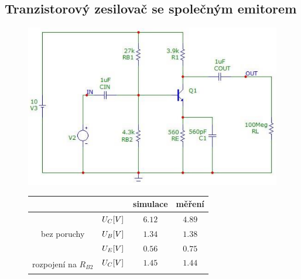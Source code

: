\documentclass{article}
\begin{document}
% 

\subsection*{Tranzistorový zesilovač se společným emitorem}

\begin{figure}[H]
  \begin{minipage}[t]{0.55\textwidth}
    \vspace{10mm}
    \includegraphics[width=\textwidth]{sim/ukol1/sch.png}
    \caption{Schema zapojení bez poruchy}
    \label{fig:sch-se}
  \end{minipage}
  \hfil
  \begin{minipage}[t]{0.4\textwidth}
    \begin{table}[H]
      \centering
      \vspace{-10mm}
      \begin{tabular}{|c|c|c|c|}
      \hline
                                                &               & simulace                  & měření                    \\ \hline  
      \multirow{3}{*}{bez poruchy}              &	\(U_C\-[V]\)  & \(6.12\)                  & \(4.89\)                  \\ \cline{2-4}
                                                & \(U_B\-[V]\)  & \(1.34\)                  & \(1.38\)                  \\ \cline{2-4}
                                                & \(U_E\-[V]\)  & \(0.56\)                  & \(0.75\)                  \\ \hline
      \multirow{3}{*}{rozpojení na \(R_{B2}\)}  &	\(U_C\-[V]\)  & \(1.45\)                  & \(1.44\)                  \\ \cline{2-4}

\end{tabular}
\end{table}
\end{minipage}
\end{figure}
\end{document}
